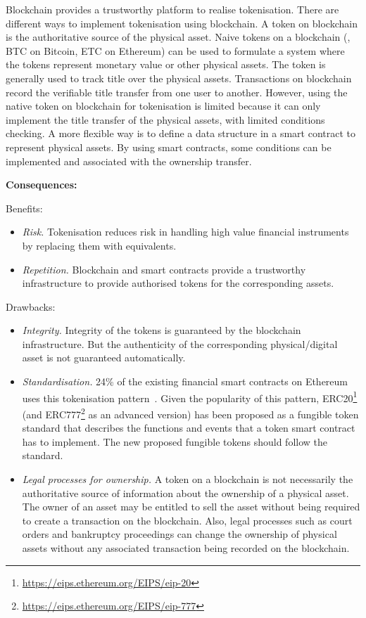 Blockchain provides a trustworthy platform to realise tokenisation. There are different ways to implement tokenisation using blockchain. A token on blockchain is the authoritative source of the physical asset. Naive tokens on a blockchain (\eg, BTC on Bitcoin, ETC on Ethereum) can be used to formulate a system where the tokens represent monetary value or other physical assets. The token is generally used to track title over the physical assets. Transactions on blockchain record the verifiable title transfer from one user to another. However, using the native token on blockchain for tokenisation is limited because it can only implement the title transfer of the physical assets, with limited conditions checking. A more flexible way is to define a data structure in a smart contract to represent physical assets. By using smart contracts, some conditions can be implemented and associated with the ownership transfer. 


\vspace{0.5em}\noindent \textbf{Consequences:} 

Benefits:
\begin{itemize}
  \item \textit{Risk.} Tokenisation reduces risk in handling high value financial instruments by replacing them with equivalents.
  \item \textit{Repetition.} Blockchain and smart contracts provide a trustworthy infrastructure to provide authorised tokens for the corresponding assets.
\end{itemize}

Drawbacks: 
\begin{itemize}
   \item \textit{Integrity.} Integrity of the tokens is guaranteed by the blockchain infrastructure. But the authenticity of the corresponding physical/digital asset is not guaranteed automatically.  
   \item \textit{Standardisation.} 24\% of the existing financial smart contracts on Ethereum uses this tokenisation pattern~\cite{designPatterns1}. Given the popularity of this pattern, ERC20\footnote{\url{https://eips.ethereum.org/EIPS/eip-20}} (and ERC777\footnote{\url{https://eips.ethereum.org/EIPS/eip-777}} as an advanced version) has been proposed as a fungible token standard that describes the functions and events that a token smart contract has to implement. The new proposed fungible tokens should follow the standard. 
   \item \textit{Legal processes for ownership.} A token on a blockchain is not necessarily the authoritative source of information about the ownership of a physical asset. The owner of an asset may be entitled to sell the asset without being required to create a transaction on the blockchain. Also, legal processes such as court orders and bankruptcy proceedings can change the ownership of physical assets without any associated transaction being recorded on the blockchain.
\end{itemize}

